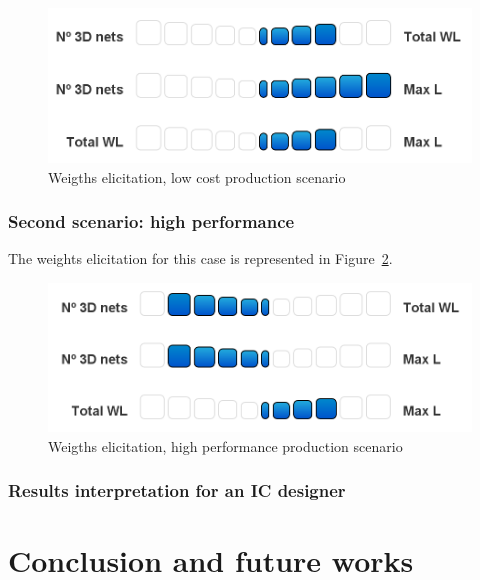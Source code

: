 \documentclass{svmult}
\begin{document}
\begin{figure}[h!]
    \centering
    \includegraphics[width=0.6\linewidth]{elicitcost.png}
    \caption{Weigths elicitation, low cost production scenario}
    \label{fig:elicitcost}
\end{figure}

\subsubsection*{Second scenario: high performance}
The weights elicitation for this case is represented in Figure~\ref{fig:elicitperf}.

\begin{figure}[h!]
    \centering
    \includegraphics[width=0.62\linewidth]{elicitperf.png}
    \caption{Weigths elicitation, high performance production scenario}
    \label{fig:elicitperf}
\end{figure}

\subsubsection{Results interpretation for an IC designer}

\section{Conclusion and future works}




\end{document}
